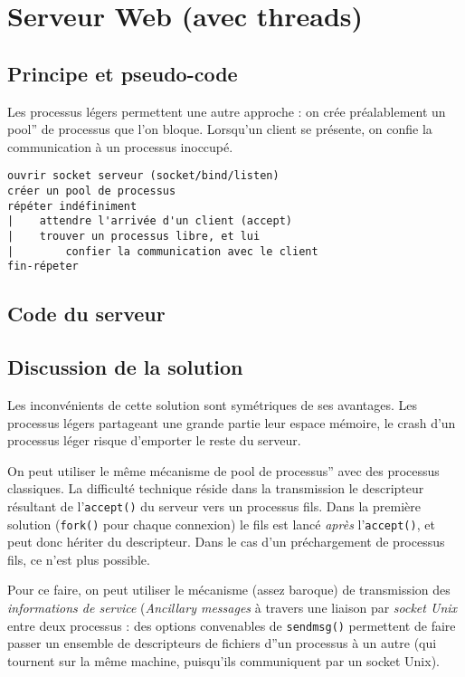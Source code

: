 \section{Serveur Web (avec threads)}

\subsection{Principe et pseudo-code}

Les processus légers permettent une autre approche : on 
crée préalablement un pool'' de processus que l'on bloque.
Lorsqu'un client se présente, on confie la communication
à un processus inoccupé.


\extrait
\begin{lstlisting}
ouvrir socket serveur (socket/bind/listen)
créer un pool de processus
répéter indéfiniment
|    attendre l'arrivée d'un client (accept)
|    trouver un processus libre, et lui
|        confier la communication avec le client
fin-répeter
\end{lstlisting}



\subsection{Code du serveur}
 
\source



\subsection{Discussion de la solution}

Les inconvénients de cette solution sont symétriques de ses avantages.
Les processus légers partageant une grande partie leur espace mémoire, le
crash d'un processus léger risque d'emporter le reste du serveur.


On peut utiliser le même mécanisme de pool de processus'' avec des
processus classiques. La difficulté technique réside dans la
transmission le descripteur résultant de l'\texttt{accept()} du
serveur vers un processus fils. Dans la première solution
(\texttt{fork()} pour chaque connexion) le fils est lancé \emph{après}
l'\texttt{accept()}, et peut donc hériter du descripteur. Dans le cas
d'un préchargement de processus fils, ce n'est plus possible.



Pour ce faire, on peut utiliser le mécanisme (assez baroque) 
de transmission des \emph{informations
de service} (\emph{Ancillary messages} à travers une liaison par 
\emph{socket Unix} entre deux processus : des options convenables
de \texttt{sendmsg()}
permettent de faire passer un ensemble de descripteurs de fichiers
d''un processus à un autre (qui tournent sur la même machine, puisqu'ils
communiquent par un socket Unix).



